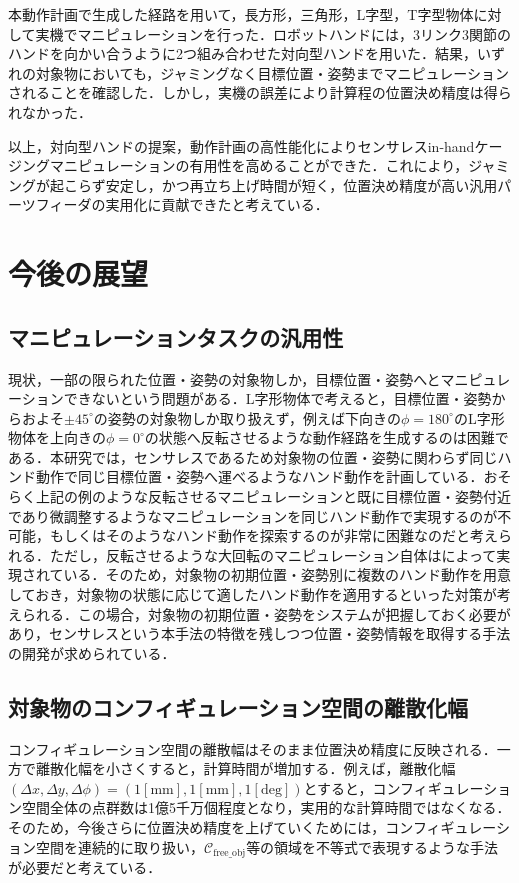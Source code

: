 \documentclass[a4paper,twoside,12pt,papersize, dvipdfmx]{iirthesis}
\begin{document}
本動作計画で生成した経路を用いて，長方形，三角形，L字型，T字型物体に対して実機でマニピュレーションを行った．ロボットハンドには，3リンク3関節のハンドを向かい合うように2つ組み合わせた対向型ハンドを用いた．結果，いずれの対象物においても，ジャミングなく目標位置・姿勢までマニピュレーションされることを確認した．しかし，実機の誤差により計算程の位置決め精度は得られなかった．

以上，対向型ハンドの提案，動作計画の高性能化によりセンサレスin-handケージングマニピュレーションの有用性を高めることができた．これにより，ジャミングが起こらず安定し，かつ再立ち上げ時間が短く，位置決め精度が高い汎用パーツフィーダの実用化に貢献できたと考えている．

\section{今後の展望}\label{sec::conclusion::future}
\subsection*{マニピュレーションタスクの汎用性}
現状，一部の限られた位置・姿勢の対象物しか，目標位置・姿勢へとマニピュレーションできないという問題がある．L字形物体で考えると，目標位置・姿勢からおよそ$\pm 45^\circ$の姿勢の対象物しか取り扱えず，例えば下向きの$\phi=180^\circ$のL字形物体を上向きの$\phi=0^\circ$の状態へ反転させるような動作経路を生成するのは困難である．本研究では，センサレスであるため対象物の位置・姿勢に関わらず同じハンド動作で同じ目標位置・姿勢へ運べるようなハンド動作を計画している．おそらく上記の例のような反転させるマニピュレーションと既に目標位置・姿勢付近であり微調整するようなマニピュレーションを同じハンド動作で実現するのが不可能，もしくはそのようなハンド動作を探索するのが非常に困難なのだと考えられる．ただし，反転させるような大回転のマニピュレーション自体は\cite{kamikukita2022}によって実現されている．そのため，対象物の初期位置・姿勢別に複数のハンド動作を用意しておき，対象物の状態に応じて適したハンド動作を適用するといった対策が考えられる．この場合，対象物の初期位置・姿勢をシステムが把握しておく必要があり，センサレスという本手法の特徴を残しつつ位置・姿勢情報を取得する手法の開発が求められている．

\subsection*{対象物のコンフィギュレーション空間の離散化幅}
コンフィギュレーション空間の離散幅はそのまま位置決め精度に反映される．一方で離散化幅を小さくすると，計算時間が増加する．例えば，離散化幅$(\Delta x, \Delta y, \Delta \phi)=(1 \mathrm{[mm]}, 1 \mathrm{[mm]}, 1 \mathrm{[deg]})$とすると，コンフィギュレーション空間全体の点群数は1億5千万個程度となり，実用的な計算時間ではなくなる．そのため，今後さらに位置決め精度を上げていくためには，コンフィギュレーション空間を連続的に取り扱い，$\mathcal{C}_{\mathrm{free\_obj}}$等の領域を不等式で表現するような手法が必要だと考えている．
\end{document}
